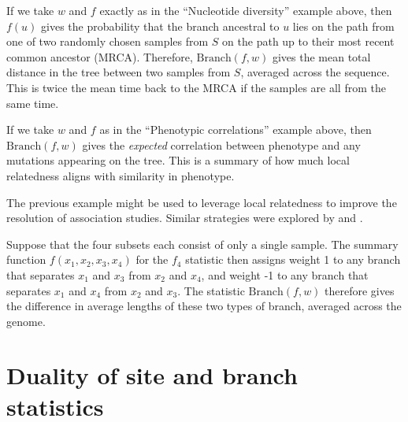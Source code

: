 \documentclass{article}
\newcommand{\branch}{\mbox{Branch}} %
\newcommand{\iw}{w} %
\begin{document}
\begin{example} \label{ex:branch_diversity}
    If we take $\iw$ and $f$ exactly as in the ``Nucleotide diversity'' example above,
    then $f(u)$ gives the probability that the branch ancestral to $u$
    lies on the path from one of two randomly chosen samples from $S$
    on the path up to their most recent common ancestor (MRCA).
    Therefore, $\branch(f, \iw)$
    gives the mean total distance in the tree between two samples from $S$,
    averaged across the sequence.
    This is twice the mean time back to the MRCA if the samples are all from the same time.
\end{example}

\begin{example} \label{ex:branch_correlation}
    If we take $\iw$ and $f$ as in the ``Phenotypic correlations'' example above,
    then $\branch(f, \iw)$ gives the \emph{expected} correlation between phenotype and any mutations
    appearing on the tree. This is a summary of how much local relatedness
    aligns with similarity in phenotype.
\end{example}

The previous example might be used to leverage local relatedness
to improve the resolution of association studies.
Similar strategies were explored by \citet{zollner2005coalescent} and \citet{minichiello2006mapping}.

\begin{example}[Patterson's $f_4$] \label{ex:branch_f4}
    Suppose that the four subsets each consist of only a single sample.
    The summary function $f(x_1, x_2, x_3, x_4)$ for the $f_4$ statistic
    then assigns weight 1 to any branch that separates $x_1$ and $x_3$ from $x_2$ and $x_4$,
    and weight -1 to any branch that separates $x_1$ and $x_4$ from $x_2$ and $x_3$.
    The statistic $\branch(f, \iw)$ therefore
    gives the difference in average lengths of these two types of branch,
    averaged across the genome.
\end{example}



\section*{Duality of site and branch statistics}
\end{document}
